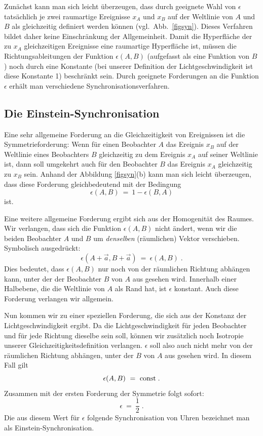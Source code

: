 Zun\"achst kann man sich leicht \"uberzeugen, dass durch geeignete 
Wahl von $\epsilon$ tats\"achlich je zwei raumartige Ereignisse $x_A$ und
$x_B$ auf der Weltlinie von $A$ und $B$ als gleichzeitig 
definiert werden k\"onnen (vgl.\ Abb.~\ref{figsyn}). 
Dieses Verfahren bildet daher keine Einschr\"ankung der Allgemeinheit. 
Damit die Hyperfl\"ache der zu $x_A$ gleichzeitigen Ereignisse eine
raumartige Hyperfl\"ache ist, m\"ussen die Richtungsableitungen der 
Funktion $\epsilon(A,B)$ (aufgefasst als eine Funktion von $B$) noch
durch eine Konstante (bei unserer Definition der Lichtgeschwindigkeit
ist diese Konstante 1) beschr\"ankt sein. Durch geeignete Forderungen
an die Funktion $\epsilon$ erh\"alt man verschiedene 
Synchronisationsverfahren.

\subsection{Die Einstein-Synchronisation}

Eine sehr allgemeine Forderung an die Gleichzeitigkeit von Ereignissen
ist die Symmetrieforderung: Wenn f\"ur einen Beobachter $A$ das 
Ereignis $x_B$ auf der Weltlinie eines Beobachters $B$ gleichzeitig zu
dem Ereignis $x_A$ auf seiner Weltlinie ist, dann soll umgekehrt auch
f\"ur den Beobachter $B$ das Ereignis $x_A$ gleichzeitig zu $x_B$ sein.
Anhand der Abbildung \ref{figsyn}(b) kann man sich leicht \"uberzeugen,
dass diese Forderung gleichbedeutend mit der Bedingung
\[          \epsilon(A,B) ~=~ 1 - \epsilon(B,A)      \]
ist. 

Eine weitere allgemeine Forderung ergibt sich aus der Homogenit\"at des
Raumes. Wir verlangen, dass sich die Funktion $\epsilon(A,B)$ nicht
\"andert, wenn wir die beiden Beobachter $A$ und $B$ um {\em denselben}
(r\"aumlichen) Vektor verschieben. Symbolisch ausgedr\"uckt:
\[     \epsilon(A+\vec{a},B+\vec{a}) ~=~ \epsilon(A,B)     \;.  \]
Dies bedeutet, dass $\epsilon(A,B)$ nur noch von der r\"aumlichen 
Richtung abh\"angen kann, unter der der Beobachter $B$ von $A$ aus gesehen
wird. Innerhalb einer Halbebene, die die Weltlinie von $A$
als Rand hat, ist $\epsilon$ konstant. Auch diese Forderung verlangen
wir allgemein.

Nun kommen wir zu einer speziellen Forderung, die sich aus der Konstanz
der Lichtgeschwindigkeit ergibt. Da die Lichtgeschwindigkeit f\"ur jeden
Beobachter und f\"ur jede Richtung dieselbe sein soll, k\"onnen wir
zus\"atzlich noch Isotropie 
unserer Gleichzeitigkeitsdefinition verlangen.
$\epsilon$ soll also auch nicht mehr von der r\"aumlichen Richtung 
abh\"angen, unter der $B$ von $A$ aus gesehen wird. In diesem Fall 
gilt
\[       \epsilon(A,B) ~=~ {\rm const}    \;.  \]
Zusammen mit der ersten Forderung der Symmetrie folgt sofort:
\[       \epsilon ~=~ \frac{1}{2}  \;.   \]
Die aus diesem Wert f\"ur $\epsilon$ folgende Synchronisation von
Uhren bezeichnet man als 
Einstein-Synchronisation. 

